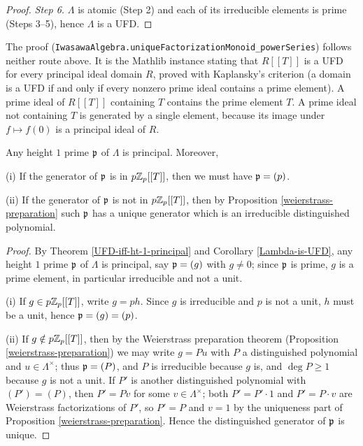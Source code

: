 \begin{proof}
\emph{Step 6.}
$\Lambda$ is atomic (Step 2) and each of its irreducible elements is prime
(Steps 3--5), hence $\Lambda$ is a UFD.
\end{proof}

\begin{remark}
The {\Lean} proof
(\texttt{IwasawaAlgebra.uniqueFactorizationMonoid\_powerSeries}) follows neither
route above. It is the Mathlib instance stating that $R[[T]]$ is a UFD for every
principal ideal domain $R$, proved with Kaplansky's criterion (a domain is a UFD
if and only if every nonzero prime ideal contains a prime element). A prime
ideal of $R[[T]]$ containing $T$ contains the prime element $T$. A prime ideal
not containing $T$ is generated by a single element, because its image under
$f\mapsto f(0)$ is a principal ideal of $R$.
\end{remark}

\begin{cor}
\label{Lambda-ht-1-principal}
\leanok
Any height $1$ prime ${\mathfrak{p}}$ of $\Lambda$
is principal. Moreover,

{\rm(i)}
If the generator of ${\mathfrak{p}}$ is in $p{\mathbb {Z}}_p[[T]]$, then
we must have ${\mathfrak{p}}=(p)$.

{\rm(ii)}
If the generator of ${\mathfrak{p}}$ is not in $p{\mathbb {Z}}_p[[T]]$, then
by Proposition \ref{weierstrass-preparation} such ${\mathfrak{p}}$
has a unique generator which is an irreducible distinguished polynomial.
\end{cor}

\begin{proof}
\leanok
By Theorem \ref{UFD-iff-ht-1-principal} and Corollary \ref{Lambda-is-UFD},
any height $1$ prime ${\mathfrak{p}}$ of $\Lambda$ is principal, say ${\mathfrak{p}}=(g)$ with
$g\neq 0$; since ${\mathfrak{p}}$ is prime, $g$ is a prime element, in particular
irreducible and not a unit.

{\rm(i)} If $g\in p{\mathbb {Z}}_p[[T]]$, write $g=ph$. Since $g$ is irreducible and $p$ is
not a unit, $h$ must be a unit, hence ${\mathfrak{p}}=(g)=(p)$.

{\rm(ii)} If $g\notin p{\mathbb {Z}}_p[[T]]$, then by the Weierstrass preparation theorem
(Proposition \ref{weierstrass-preparation}) we may write $g=Pu$ with $P$ a
distinguished polynomial and $u\in\Lambda^\times$; thus ${\mathfrak{p}}=(P)$, and $P$ is
irreducible because $g$ is, and $\deg P\geq 1$ because $g$ is not a unit.
If $P'$ is another distinguished polynomial with $(P')=(P)$, then $P'=Pv$ for
some $v\in\Lambda^\times$; both $P'=P'\cdot 1$ and $P'=P\cdot v$ are Weierstrass
factorizations of $P'$, so $P'=P$ and $v=1$ by the uniqueness part of
Proposition \ref{weierstrass-preparation}.
Hence the distinguished generator of ${\mathfrak{p}}$ is unique.
\end{proof}

